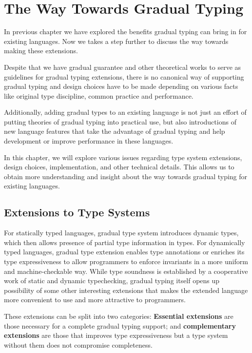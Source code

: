 
\section{The Way Towards Gradual Typing}


In previous chapter we have explored the benefits gradual typing
can bring in for existing languages.
Now we takes a step further to discuss the way towards making these extensions.

Despite that we have gradual guarantee\cite{siek2015refined} and other
theoretical works to serve as guidelines for gradual typing extensions,
there is no canonical way of supporting gradual typing
and design choices have to be made
depending on various facts like original type discipline, common practice and performance.

Additionally, adding gradual types to an existing language
is not just an effort of putting theories of gradual typing into practical use,
but also introductions of new language features
that take the advantage of gradual typing
and help development or improve performance in these languages.

In this chapter, we will explore various issues regarding
type system extensions, design choices,
implementation, and other technical details.
This allows us to obtain more understanding and insight about the way towards gradual typing for existing languages.

\subsection{Extensions to Type Systems}

For statically typed languages, gradual type system introduces
dynamic types, which then allows presence of partial type information
in types.
For dynamically typed languages, gradual type extension
enables type annotations or enriches its type expressiveness
to allow programmers to enforce invariants in a more uniform and
machine-checkable way.
While type soundness is established by a cooperative work
of static and dynamic typechecking,
gradual typing itself opens up possibility of some other interesting extensions
that makes the extended language more convenient to use and more attractive to programmers.

These extensions can be split into two categories:
\textbf{Essential extensions} are those necessary
for a complete gradual typing support;
and \textbf{complementary extensions} are those that improves type expressiveness
but a type system without them does not compromise completeness.

